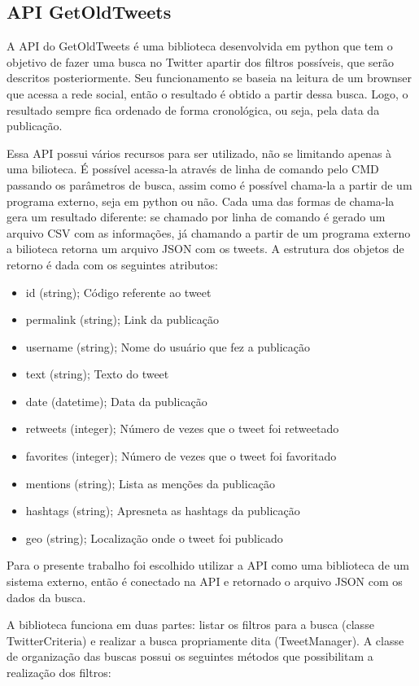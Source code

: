 \subsection{API GetOldTweets}

A API do GetOldTweets é uma biblioteca desenvolvida em python que tem o objetivo de fazer uma busca no Twitter apartir dos filtros possíveis, que serão descritos posteriormente. Seu funcionamento se baseia na leitura de um brownser que acessa a rede social, então o resultado é obtido a partir dessa busca. Logo, o resultado sempre fica ordenado de forma cronológica, ou seja, pela data da publicação.

Essa API possui vários recursos para ser utilizado, não se limitando apenas à uma bilioteca. É possível acessa-la através de linha de comando pelo CMD passando os parâmetros de busca, assim como é possível chama-la a partir de um programa externo, seja em python ou não. Cada uma das formas de chama-la gera um resultado diferente: se chamado por linha de comando é gerado um arquivo CSV com as informações, já chamando a partir de um programa externo a bilioteca retorna um arquivo JSON com os tweets. A estrutura dos objetos de retorno é dada com os seguintes atributos:

\begin{itemize}
\item id (string); Código referente ao tweet
\item permalink (string); Link da publicação
\item username (string); Nome do usuário que fez a publicação
\item text (string); Texto do tweet
\item date (datetime); Data da publicação
\item retweets (integer); Número de vezes que o tweet foi retweetado
\item favorites (integer); Número de vezes que o tweet foi favoritado
\item mentions (string); Lista as menções da publicação
\item hashtags (string); Apresneta as hashtags da publicação
\item geo (string); Localização onde o tweet foi publicado
\end{itemize}

Para o presente trabalho foi escolhido utilizar a API como uma biblioteca de um sistema externo, então é conectado na API e retornado o arquivo JSON com os dados da busca. 

A biblioteca funciona em duas partes: listar os filtros para a busca (classe TwitterCriteria) e realizar a busca propriamente dita (TweetManager). A classe de organização das buscas possui os seguintes métodos que possibilitam a realização dos filtros:

